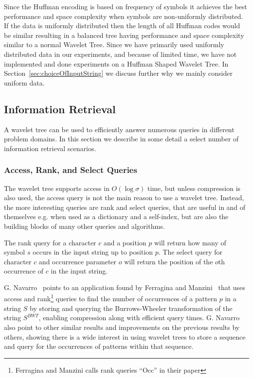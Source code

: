 Since the Huffman encoding is based on frequency of symbols it achieves the best performance and space complexity when symbols are non-uniformly distributed.
If the data is uniformly distributed then the length of all Huffman codes would be similar resulting in a balanced tree having performance and space complexity similar to a normal Wavelet Tree.
Since we have primarily used uniformly distributed data in our experiments, and because of limited time, we have not implemented and done experiments on a Huffman Shaped Wavelet Tree.
In Section~\ref{sec:choiceOfInputString} we discuss further why we mainly consider uniform data.


\subsection{Information Retrieval}
A wavelet tree can be used to efficiently answer numerous queries in different problem domains.
In this section we describe in some detail a select number of information retrieval scenarios.

\subsubsection{Access, Rank, and Select Queries}
The wavelet tree supports access in $O(\log \sigma)$ time, but unless compression is also used, the access query is not the main reason to use a wavelet tree.
Instead, the more interesting queries are rank and select queries, that are useful in and of themselves e.g. when used as a dictionary and a self-index, but are also the building blocks of many other queries and algorithms.

The rank query for a character $c$ and a position $p$ will return how many of symbol $s$ occurs in the input string up to position $p$.
The select query for character $c$ and occurrence parameter $o$ will return the position of the $o$th occurrence of $c$ in the input string.

G. Navarro~ points to an application found by Ferragina and Manzini~ that uses access and rank\footnote{Ferragina and Manzini calls rank queries “Occ” in their paper} queries to find the number of occurrences of a pattern $p$ in a string $S$ by storing and querying the Burrows-Wheeler transformation of the string $S^{BWT}$, enabling compression along with efficient query times.
G. Navarro~ also point to other similar results and improvements on the previous results by others, showing there is a wide interest in using wavelet trees to store a sequence and query for the occurrences of patterns within that sequence.

